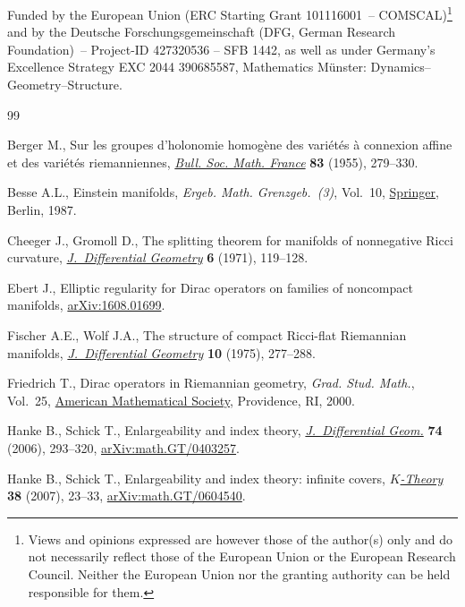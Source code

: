 \documentclass[pdftex]{sigma}
\numberwithin{equation}{section}
\begin{document}
Funded by the European Union (ERC Starting Grant 101116001~-- COMSCAL)\footnote{Views and opinions expressed are however those of the author(s) only and do not necessarily reflect those of the European Union or the European Research Council. Neither the European Union nor the granting authority can be held responsible for them.}
 and by the Deutsche Forschungsgemeinschaft (DFG, German Research Foundation)~-- Project-ID 427320536 -- SFB 1442, as well as under Germany’s Excellence Strategy EXC 2044 390685587, Mathematics M\"unster: Dynamics--Geometry--Structure.

\begin{thebibliography}{99}
\footnotesize\itemsep=0pt

Berger M., Sur les groupes d'holonomie homog\`ene des vari\'et\'es \`a
 connexion affine et des vari\'et\'es riemanniennes,
 \href{https://doi.org/10.24033/bsmf.1464}{\textit{Bull. Soc. Math. France}}
 \textbf{83} (1955), 279--330.

Besse A.L., Einstein manifolds, \textit{Ergeb. Math. Grenzgeb.~(3)}, Vol.~10,
 \href{https://doi.org/10.1007/978-3-540-74311-8}{Springer}, Berlin, 1987.

Cheeger J., Gromoll D., The splitting theorem for manifolds of nonnegative
 {R}icci curvature,
 \href{https://doi.org/10.4310/jdg/1214430220}{\textit{J.~Differential
 Geometry}} \textbf{6} (1971), 119--128.

Ebert J., Elliptic regularity for Dirac operators on families of noncompact
 manifolds, \href{http://arxiv.org/abs/1608.01699}{arXiv:1608.01699}.

Fischer A.E., Wolf J.A., The structure of compact {R}icci-flat {R}iemannian
 manifolds,
 \href{https://doi.org/10.4310/jdg/1214432794}{\textit{J.~Differential
 Geometry}} \textbf{10} (1975), 277--288.

Friedrich T., Dirac operators in {R}iemannian geometry, \textit{Grad. Stud.
 Math.}, Vol.~25, \href{https://doi.org/10.1090/gsm/025}{American Mathematical
 Society}, Providence, RI, 2000.

Hanke B., Schick T., Enlargeability and index theory,
 \href{https://doi.org/10.4310/jdg/1175266206}{\textit{J.~Differential Geom.}}
 \textbf{74} (2006), 293--320,
 \href{http://arxiv.org/abs/math.GT/0403257}{arXiv:math.GT/0403257}.

Hanke B., Schick T., Enlargeability and index theory: infinite covers,
 \href{https://doi.org/10.1007/s10977-007-9004-3}{\textit{$K$-Theory}}
 \textbf{38} (2007), 23--33,
 \href{http://arxiv.org/abs/math.GT/0604540}{arXiv:math.GT/0604540}.


\end{thebibliography}
\end{document}

